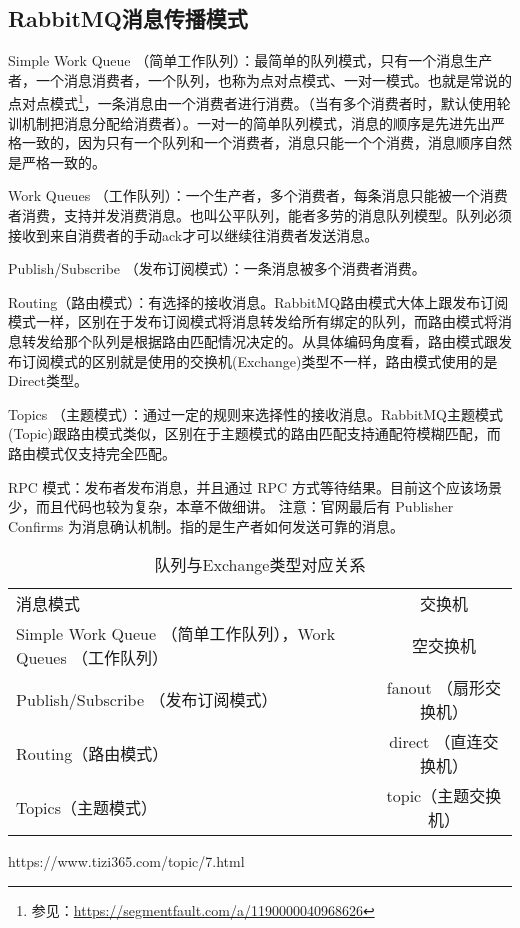 \documentclass[../../../interview-questions.tex]{subfiles}
\begin{document}
\subsection{RabbitMQ消息传播模式}

Simple Work Queue （简单工作队列）：最简单的队列模式，只有一个消息生产者，一个消息消费者，一个队列，也称为点对点模式、一对一模式。也就是常说的点对点模式\footnote{参见：\url{https://segmentfault.com/a/1190000040968626}}，一条消息由一个消费者进行消费。（当有多个消费者时，默认使用轮训机制把消息分配给消费者）。一对一的简单队列模式，消息的顺序是先进先出严格一致的，因为只有一个队列和一个消费者，消息只能一个个消费，消息顺序自然是严格一致的。

Work Queues （工作队列）：一个生产者，多个消费者，每条消息只能被一个消费者消费，支持并发消费消息。也叫公平队列，能者多劳的消息队列模型。队列必须接收到来自消费者的手动ack才可以继续往消费者发送消息。

Publish/Subscribe （发布订阅模式）：一条消息被多个消费者消费。

Routing（路由模式）：有选择的接收消息。RabbitMQ路由模式大体上跟发布订阅模式一样，区别在于发布订阅模式将消息转发给所有绑定的队列，而路由模式将消息转发给那个队列是根据路由匹配情况决定的。从具体编码角度看，路由模式跟发布订阅模式的区别就是使用的交换机(Exchange)类型不一样，路由模式使用的是Direct类型。

Topics （主题模式）：通过一定的规则来选择性的接收消息。RabbitMQ主题模式(Topic)跟路由模式类似，区别在于主题模式的路由匹配支持通配符模糊匹配，而路由模式仅支持完全匹配。

RPC 模式：发布者发布消息，并且通过 RPC 方式等待结果。目前这个应该场景少，而且代码也较为复杂，本章不做细讲。
注意：官网最后有 Publisher Confirms 为消息确认机制。指的是生产者如何发送可靠的消息。

\begin{table}[htbp]
	\caption{队列与Exchange类型对应关系}
	\label{table:queueexchange}
	\begin{center}
		\begin{tabular}{p{6cm}c}
			\hline
			\multirow{1}{*}{消息模式}
			& \multicolumn{1}{c}{交换机} \\			
			\cline{1-2}
			Simple Work Queue （简单工作队列），Work Queues （工作队列） &  空交换机   \\
			\hline
			Publish/Subscribe （发布订阅模式） &  fanout （扇形交换机）  \\
			\hline
			Routing（路由模式） &  direct （直连交换机） \\
			\hline	
            Topics（主题模式） &  topic（主题交换机） \\
			\hline						
		\end{tabular}	
	\end{center}
\end{table}

https://www.tizi365.com/topic/7.html
\end{document}

